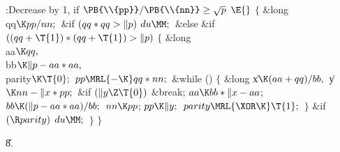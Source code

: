 \Y\B\4:Decrease  by 1, if $\PB{\\{pp}}/\PB{\\{nn}}\ge\sqrt p$%
\X${}\E{}$\6
${}\{{}$\5
\1\&{long} \\{qq}${}\K\\{pp}/\\{nn};{}$\7
\&{if} ${}(\\{qq}*\\{qq}>\|p){}$\1\5
${}\\{du}\MM;{}$\2\6
\&{else} \&{if} ${}((\\{qq}+\T{1})*(\\{qq}+\T{1})>\|p){}$\5
${}\{{}$\1\6
\&{long} \\{aa}${}\K\\{qq},{}$ \\{bb}${}\K\|p-\\{aa}*\\{aa},{}$ \\{parity}${}\K%
\T{0};{}$\7
${}\\{pp}\MRL{-{\K}}\\{qq}*\\{nn};{}$\6
\&{while} ()\5
${}\{{}$\1\6
\&{long} \|x${}\K(\\{aa}+\\{qq})/\\{bb},{}$ \|y${}\K\\{nn}-\|x*\\{pp};{}$\7
\&{if} ${}(\|y\Z\T{0}){}$\1\5
\&{break};\2\6
${}\\{aa}\K\\{bb}*\|x-\\{aa}{}$;\6
${}\\{bb}\K(\|p-\\{aa}*\\{aa})/\\{bb};{}$\6
${}\\{nn}\K\\{pp}{}$;\5
${}\\{pp}\K\|y;{}$\6
${}\\{parity}\MRL{{\XOR}{\K}}\T{1};{}$\6
\4${}\}{}$\2\6
\&{if} ${}(\R\\{parity}){}$\1\5
${}\\{du}\MM;{}$\2\6
\4${}\}{}$\2\6
\4${}\}{}$\2\par
\U8.\fi

